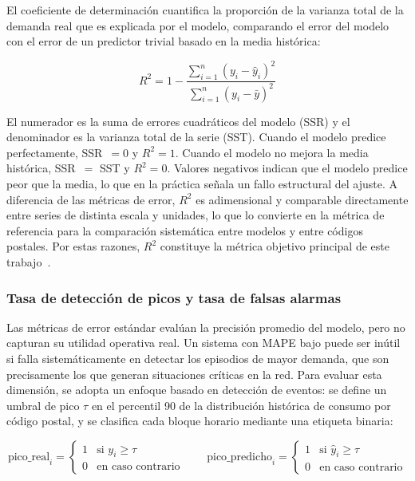 \documentclass[12pt, a4paper]{article}
\begin{document}
El coeficiente de determinación cuantifica la proporción de la varianza total de la demanda real que es explicada por el modelo, comparando el error del modelo con el error de un predictor trivial basado en la media histórica:

\begin{equation}
R^2 = 1 - \frac{\sum_{i=1}^{n}(y_i - \hat{y}_i)^2}{\sum_{i=1}^{n}(y_i - \bar{y})^2}
\end{equation}

El numerador es la suma de errores cuadráticos del modelo (SSR) y el denominador es la varianza total de la serie (SST). Cuando el modelo predice perfectamente, SSR~$= 0$ y $R^2 = 1$. Cuando el modelo no mejora la media histórica, SSR~$=$ SST y $R^2 = 0$. Valores negativos indican que el modelo predice peor que la media, lo que en la práctica señala un fallo estructural del ajuste. A diferencia de las métricas de error, $R^2$ es adimensional y comparable directamente entre series de distinta escala y unidades, lo que lo convierte en la métrica de referencia para la comparación sistemática entre modelos y entre códigos postales. Por estas razones, $R^2$ constituye la métrica objetivo principal de este trabajo~\cite{gassar2024, rubattu2023}.

\subsubsection{Tasa de detección de picos y tasa de falsas alarmas}

Las métricas de error estándar evalúan la precisión promedio del modelo, pero no capturan su utilidad operativa real. Un sistema con MAPE bajo puede ser inútil si falla sistemáticamente en detectar los episodios de mayor demanda, que son precisamente los que generan situaciones críticas en la red. Para evaluar esta dimensión, se adopta un enfoque basado en detección de eventos: se define un umbral de pico $\tau$ en el percentil 90 de la distribución histórica de consumo por código postal, y se clasifica cada bloque horario mediante una etiqueta binaria:

\begin{equation}
\text{pico\_real}_i = \begin{cases} 1 & \text{si } y_i \geq \tau \\ 0 & \text{en caso contrario} \end{cases} \qquad \text{pico\_predicho}_i = \begin{cases} 1 & \text{si } \hat{y}_i \geq \tau \\ 0 & \text{en caso contrario} \end{cases}
\end{equation}
\end{document}
